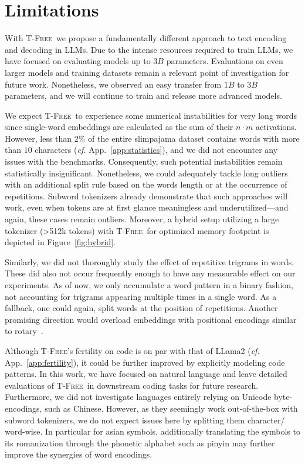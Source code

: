 \documentclass[11pt]{article}
\newcommand{\method}{\textsc{T-Free}}
\begin{document}
\section*{Limitations}

With \method\ we propose a fundamentally different approach to text encoding and decoding in LLMs.
Due to the intense resources required to train LLMs, we have focused on evaluating models up to $3B$ parameters. Evaluations on even larger models and training datasets remain a relevant point of investigation for future work. Nonetheless, we observed an easy transfer from $1B$ to $3B$ parameters, and we will continue to train and release more advanced models.

We expect \method\ to experience some numerical instabilities for very long words since single-word embeddings are calculated as the sum of their $n \cdot m$ activations. However, less than $2\%$ of the entire slimpajama dataset contains words with more than $10$ characters (\emph{cf.} App.~\ref{app:statistics}), and we did not encounter any issues with the benchmarks. Consequently, such potential instabilities remain statistically insignificant.
Nonetheless, we could adequately tackle long outliers with an additional split rule based on the words length or at the occurrence of repetitions. Subword tokenizers already demonstrate that such approaches will work, even when tokens are at first glance meaningless and underutilized---and again, these cases remain outliers. Moreover, a hybrid setup utilizing a large tokenizer (>512k tokens) with \method~for optimized memory footprint is depicted in Figure~\ref{fig:hybrid}.

Similarly, we did not thoroughly study the effect of repetitive trigrams in words. These did also not occur frequently enough to have any measurable effect on our experiments. As of now, we only accumulate a word pattern in a binary fashion, not accounting for trigrams appearing multiple times in a single word.
As a fallback, one could again, split words at the position of repetitions. Another promising direction would overload embeddings with positional encodings similar to rotary~\cite{rotary}. 


Although \method's fertility on code is on par with that of LLama2 (\emph{cf.} App.~\ref{app:fertility}), it could be further improved by explicitly modeling code patterns. In this work, we have focused on natural language and leave detailed evaluations of \method\ in downstream coding tasks for future research.
Furthermore, we did not investigate languages entirely relying on Unicode byte-encodings, such as Chinese. However, as they seemingly work out-of-the-box with subword tokenizers, we do not expect issues here by splitting them character/ word-wise. In particular for asian symbols, additionally translating the symbols to its romanization through the phonetic alphabet such as pinyin may further improve the synergies of word encodings. 
\end{document}
